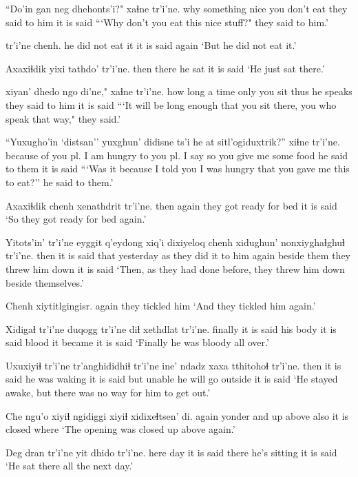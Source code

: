 \documentclass[12pt]{article}
\begin{document}
\gll ``Do'in gan neg dhehonts'i?"  xaɬne  tr'i'ne.
why  something nice {you don't eat} {they said to him} {it is said}
\glt ```Why don't you eat this nice stuff?" they said to him.'
\glend

  tr'i'ne chenh.
{he did not eat it}  {it is said} again
\glt `But he did not eat it.'
\glend

\gll Axaxiɬdik yixi tathdo' tr'i'ne.
then  there {he sat} {it is said}
\glt `He just sat there.'
\glend

 xiyan' dhedo ngo di'ne,"  xaɬne  tr'i'ne.
{how long a time}   only  {you sit} thus {he speaks}  {they said to him} {it is said}
\glt ```It will be long enough that you sit there, you who speak that way," they said.'
\glend

\gll ``Yuxugho'in  `distsan'' yuxghun' didisne ts'i he at sitl'ogiduxtrik?''  xiɬne   tr'i'ne.
{because of you pl.} {I am hungry} {to you pl.} {I say so} {} {} {} {you give me some food} {he said to them} {it is said}
\glt ```Was it because I told you I was hungry that you gave me this to eat?'' he said to them.'
\glend

\gll Axaxiɬdik chenh xenathdrit   tr'i'ne.
then  again {they got ready for bed}  {it is said}
\glt `So they got ready for bed again.'
\glend

\gll Yitots'in' tr'i'ne eyggit q'eydong xiq'i dixiyeloq chenh xidughun' nonxiyghaɬghuɬ  tr'i'ne.
then  {it is said} that  yesterday as {they did it to him} again {beside them} {they threw him down}  {it is said}
\glt `Then, as they had done before, they threw him down beside themselves.'
\glend

\gll Chenh xiytitlgingisr.
again  {they tickled him}
\glt `And they tickled him again.'
\glend

\gll Xidigaɬ tr'i'ne duqogg tr'i'ne diɬ xethdlat tr'i'ne.
finally  {it is said} {his body} {it is said} blood {it became} {it is said}
\glt `Finally he was bloody all over.'
\glend

\gll Uxuxiyiɬ tr'i'ne tr'anghididhiɬ tr'i'ne ine' {ndadz xaxa} tthitohoɬ tr'i'ne.
then  {it is said} {he was waking}  {it is said} but unable {he will go outside} {it is said}
\glt `He stayed awake, but there was no way for him to get out.'
\glend

\gll Che ngu'o xiyiɬ ngidiggi xiyiɬ xidixeɬtsen' di.
again yonder and {up above} also {it is closed} where
\glt `The opening was closed up above again.'
\glend

\gll Deg dran tr'i'ne yit dhido  tr'i'ne.
here day {it is said} there {he's sitting} {it is said}
\glt `He sat there all the next day.'
\glend
\end{document}
